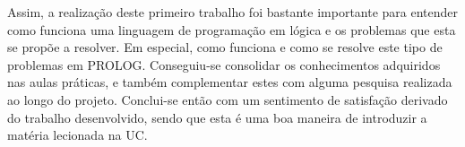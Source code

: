 \documentclass[a4paper]{article}
\begin{document}
Assim, a realização deste primeiro trabalho foi bastante importante para entender como funciona uma linguagem de programação em lógica e os problemas que esta se propõe a resolver. Em especial, como funciona e como se resolve este tipo de problemas em PROLOG. Conseguiu-se consolidar os conhecimentos adquiridos nas aulas práticas, e também complementar estes com alguma pesquisa realizada ao longo do projeto. Conclui-se então com um sentimento de satisfação derivado do trabalho desenvolvido, sendo que esta é uma boa maneira de introduzir a matéria lecionada na UC.

\newpage
{}

\end{document}
